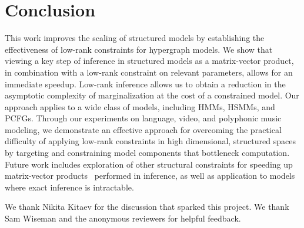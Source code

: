 \documentclass{article}
\begin{document}
\section{Conclusion}

This work improves the scaling of structured models by establishing the effectiveness of low-rank constraints for hypergraph models. We show that viewing a key step of inference in structured models as a matrix-vector product, in combination with a low-rank constraint on relevant parameters, allows for an immediate speedup. 
Low-rank inference allows us to obtain a reduction in the asymptotic complexity of marginalization at the cost of 
a constrained model. 
Our approach applies to a wide class of models, including HMMs, HSMMs, and PCFGs. Through our experiments on language, video, and polyphonic music modeling, we demonstrate an effective approach for overcoming the practical difficulty of applying low-rank constraints in high dimensional, structured spaces by targeting and constraining model components that bottleneck computation. Future work includes exploration of other structural constraints for speeding up matrix-vector products~\citep{kaleidoscope} performed in inference, as well as application to models where exact inference is intractable.

\begin{ack}
We thank Nikita Kitaev for the discussion that sparked this project.
We thank Sam Wiseman and the anonymous reviewers for helpful feedback.
\end{ack}





\end{document}
